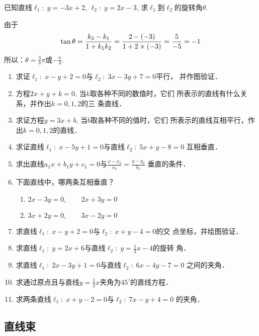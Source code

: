\begin{example}
    已知直线$\ell_1:\; y=-3x+2$, $\ell_2:\; y=2x-3$, 
求$\ell_1$到$\ell_2$的旋转角$\theta$.
\end{example}

\begin{solution}
由于
\[\tan\theta=\dfrac{k_2-k_1}{1+k_1k_2}=\dfrac{2-(-3)}{1+2\times (-3)}=\dfrac{5}{-5}=-1\]
所以：$\theta=\frac{3}{4}\pi$或$-\frac{\pi}{4}$.
\end{solution}

\begin{ex}
\begin{enumerate}
    \item 求证$\ell_1:\; x-y+2=0$与$\ell_2:\;3x-3y+7=0$平行，
    并作图验证．
    \item 方程$2x+y+k=0$, 当$k$取各种不同的数值时，它们
    所表示的直线有什么关系，并作出$k=0,1,2$的三
    条直线．
    \item 求证方程$y=3x+b$, 当$b$取各种不同的值时，它们
    所表示的直线互相平行，作出$k=0,1,2$的直线．
    \item 求证直线$\ell_1:\; x-5y+1=0$与直线$\ell_2:\; 5x+y-8=0$
    互相垂直．
     \item 求出直线$a_1x+b_1y+c_1=0$与$\frac{x-x_0}{a_2}=\frac{y-y_0}{b_2}$
    垂直的条件．
    \item 下面直线中，哪两条互相垂直？
\begin{enumerate}
    \item $2x-3y=0,\qquad 2x+3y=0$
    \item $3x+2y=0,\qquad 3x-2y=0$
\end{enumerate}

    \item 求直线$\ell_1:\; x-y+2=0$与$\ell_2:\; x+y-4=0$的交
    点坐标，并绘图验证．
    \item 求直线$\ell_1:\; y=2x+6$与直线$\ell_2:\; y=\frac{1}{3}x-4$的旋转
    角．
\item 求直线$\ell_1:\; 2x-3y+1=0$与直线$\ell_2:\; 6x-4y-7=0$
之间的夹角．
\item 求通过原点且与直线$y=\frac{1}{2}x$夹角为$45^{\circ}$的直线方程．
\item 求两条直线$\ell_1:\; x+y-2=0$与$\ell_2:\; 7x-y+4=0$
的夹角．
\end{enumerate}
\end{ex}


\subsection{直线束}



